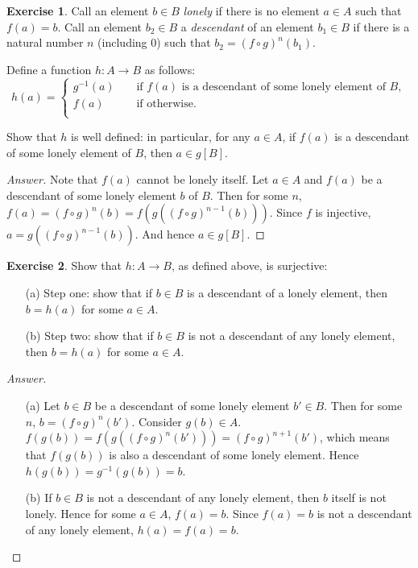 \documentclass[11pt]{article}
\theoremstyle{definition}
\newtheorem{exer}{Exercise}
\begin{document}
\begin{exer}
Call an element $b \in B$ \textit{lonely} if there is no element $a \in A$ such that $f(a) = b$. Call an element $b_2 \in B$ a \textit{descendant} of an element $b_1 \in B$ if there is a natural number $n$ (including $0$) such that $b_2 = (f \circ g)^n (b_1)$.

Define a function $h: A \rightarrow B$ as follows:
\[
h(a) = 
\begin{cases}
g^{-1}(a) \; \; \; \; & \text{if} \, \, f(a) \, \, \text{is a descendant of some lonely element of} \, \, B, \\
f(a) \; \; \; \; & \text{if otherwise}. \\
\end{cases}
\]

Show that $h$ is well defined: in particular, for any $a \in A$, if $f(a)$ is a descendant of some lonely element of $B$, then $a \in g[B]$.
\end{exer}

\begin{proof}[Answer]
Note that $f(a)$ cannot be lonely itself. Let $a \in A$ and $f(a)$ be a descendant of some lonely element $b$ of $B$. Then for some $n$, $f(a) = (f \circ g)^n(b) = f(g((f \circ g)^{n-1}(b)))$. Since $f$ is injective, $a = g((f \circ g)^{n-1}(b))$. And hence $a \in g[B]$.

\end{proof}

\begin{exer}
Show that $h: A \rightarrow B$, as defined above, is surjective:
\begin{enumerate}
\item[(a)] Step one: show that if $b \in B$ is a descendant of a lonely element, then $b = h(a)$ for some $a \in A$.
\item[(b)] Step two: show that if $b \in B$ is not a descendant of any lonely element, then $b = h(a)$ for some $a \in A$.
\end{enumerate}
\end{exer}

\begin{proof}[Answer]
\begin{enumerate}
\item[(a)] Let $b \in B$ be a descendant of some lonely element $b' \in B$. Then for some $n$, $b =  (f \circ g)^n(b')$. Consider $g(b) \in A$. $f(g(b)) = f(g((f \circ g)^n(b'))) = (f \circ g)^{n+1}(b')$, which means that $f(g(b))$ is also a descendant of some lonely element. Hence $h(g(b)) = g^{-1}(g(b)) = b$.
\item[(b)] If $b \in B$ is not a descendant of any lonely element, then $b$ itself is not lonely. Hence for some $a \in A$, $f(a) = b$. Since $f(a) = b$ is not a descendant of any lonely element, $h(a) = f(a) = b$. 
\end{enumerate}

\end{proof}
\end{document}
